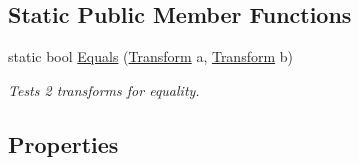 \subsection*{Static Public Member Functions}
\begin{DoxyCompactItemize}
\item 
static bool \mbox{\hyperlink{class_lua_1_1_transform_a17093d64239d0605cfdd83d9154fcf08}{Equals}} (\mbox{\hyperlink{class_lua_1_1_transform}{Transform}} a, \mbox{\hyperlink{class_lua_1_1_transform}{Transform}} b)
\begin{DoxyCompactList}\small\item\em Tests 2 transforms for equality. \end{DoxyCompactList}\end{DoxyCompactItemize}
\subsection*{Properties}
